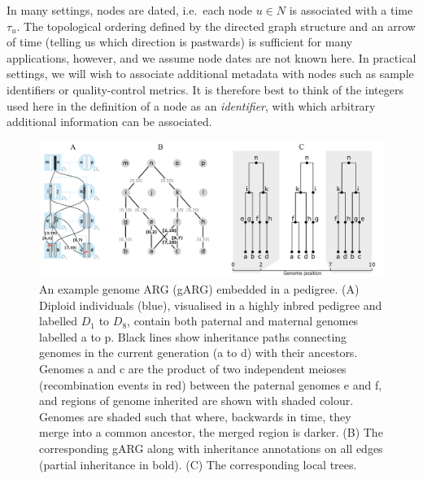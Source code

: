 \documentclass{article}
\newcommand{\noderef}[1]{\textsf{#1}}
\begin{document}
In many settings, nodes are dated, i.e.\ each
node $u\in N$ is associated with a time $\tau_u$.
The topological ordering defined by the directed graph structure
and an arrow of time (telling us which direction is pastwards)
is sufficient for many applications, however,
and we assume node dates are not known here.
In practical settings, we will wish to associate additional
metadata with nodes such as sample identifiers or quality-control metrics.
It is therefore best to think of the
integers used here in the definition of a node as an \emph{identifier},
with which arbitrary additional information can be associated.

\begin{figure}
\begin{center}
    \includegraphics[width=\textwidth]{illustrations/arg-in-pedigree}
\end{center}
\caption{\label{fig-arg-in-pedigree}
An example genome ARG (gARG) embedded in a pedigree.
(A) Diploid individuals (blue), visualised in a highly inbred pedigree and
labelled $D_1$ to $D_8$,
contain both paternal and maternal  genomes
labelled \noderef{a} to \noderef{p}. Black lines show inheritance paths connecting
genomes in the current generation (\noderef{a} to \noderef{d}) with their ancestors.
Genomes \noderef{a} and \noderef{c} are the product of two independent
meioses (recombination events in red) between
the paternal genomes \noderef{e}
and \noderef{f}, and regions of genome inherited are shown with shaded colour.
Genomes are shaded such that where, backwards in time,
they merge into a common ancestor, the merged region is darker.
(B) The corresponding gARG along with inheritance annotations on all edges
(partial inheritance in bold).
(C) The corresponding local trees.
}
\end{figure}
\end{document}

